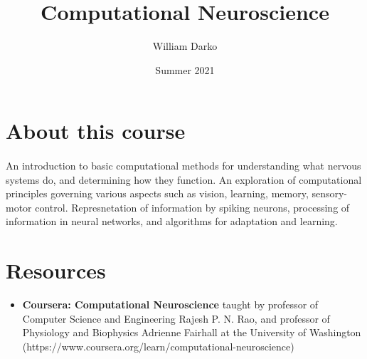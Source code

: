 \documentclass[12pt, a4paper]{article}
\title{Computational Neuroscience}
\author{William Darko}
\date{Summer 2021}
\begin{document}
\maketitle
\newpage

\tableofcontents

\newpage

\section{About this course}
\paragraph*{}
An introduction to basic computational methods for understanding what nervous
systems do, and determining how they function. An exploration of computational principles
governing various aspects such as vision, learning, memory, sensory-motor control. Represnetation of information by spiking neurons,
processing of information in neural networks, and algorithms for adaptation and learning.


\newpage

\section{Resources}

\begin{itemize}
   \item \textbf{Coursera: Computational Neuroscience} taught by professor of 
   Computer Science and Engineering Rajesh P. N. Rao, and  professor of Physiology and Biophysics
   Adrienne Fairhall at the University of Washington (https://www.coursera.org/learn/computational-neuroscience)
\end{itemize}

\newpage
\end{document}
